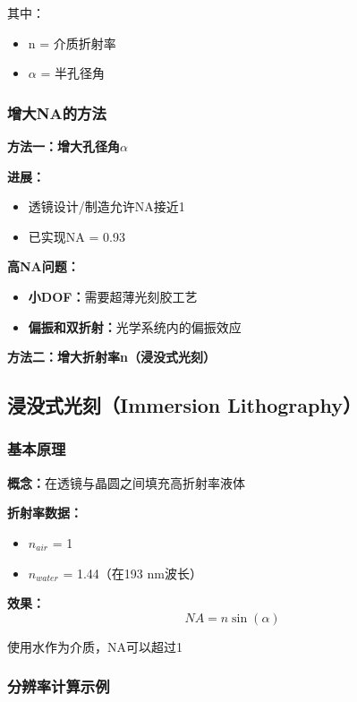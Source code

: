 \documentclass[UTF8,12pt,a4paper]{ctexart}
\begin{document}
其中：
\begin{itemize}
    \item n = 介质折射率
    \item $\alpha$ = 半孔径角
\end{itemize}

\subsubsection{增大NA的方法}

\textbf{方法一：增大孔径角$\alpha$}

\textbf{进展：}
\begin{itemize}
    \item 透镜设计/制造允许NA接近1
    \item 已实现NA = 0.93
\end{itemize}

\textbf{高NA问题：}
\begin{itemize}
    \item \textbf{小DOF：}需要超薄光刻胶工艺
    \item \textbf{偏振和双折射：}光学系统内的偏振效应
\end{itemize}

\textbf{方法二：增大折射率n（浸没式光刻）}

\subsection{浸没式光刻（Immersion Lithography）}

\subsubsection{基本原理}

\textbf{概念：}在透镜与晶圆之间填充高折射率液体

\textbf{折射率数据：}
\begin{itemize}
    \item $n_{air}$ = 1
    \item $n_{water}$ = 1.44（在193 nm波长）
\end{itemize}

\textbf{效果：}
\begin{equation}
NA = n \sin(\alpha)
\end{equation}

使用水作为介质，NA可以超过1

\subsubsection{分辨率计算示例}
\end{document}
